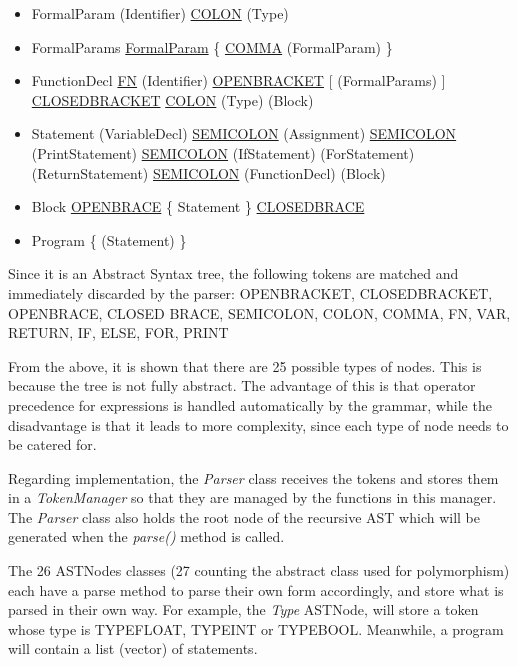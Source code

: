 \begin{itemize}
	\item FormalParam
		\subitem (Identifier) \ul{COLON} (Type)
	\item FormalParams
		\subitem \ul{FormalParam} \{ \ul{COMMA} (FormalParam) \}
	\item FunctionDecl
		\subitem \ul{FN} (Identifier) \ul{OPEN\un BRACKET} [ (FormalParams) ] \ul{CLOSED\un BRACKET} \ul{COLON} (Type) (Block)
	\item Statement
		\subitem (VariableDecl) \ul{SEMI\un COLON}
		\subitem (Assignment) \ul{SEMI\un COLON}
		\subitem (PrintStatement) \ul{SEMI\un COLON}
		\subitem (IfStatement)
		\subitem (ForStatement)
		\subitem (ReturnStatement) \ul{SEMI\un COLON}
		\subitem (FunctionDecl)
		\subitem (Block)
	\item Block
		\subitem \ul{OPEN\un BRACE} \{ Statement \} \ul{CLOSED\un BRACE}
	\item Program
		\subitem \{ (Statement) \}
\end{itemize}

Since it is an Abstract Syntax tree, the following tokens are matched and immediately discarded by the parser: OPEN\un BRACKET, CLOSED\un BRACKET, OPEN\un BRACE, CLOSED \un BRACE, SEMI\un COLON, COLON, COMMA, FN, VAR, RETURN, IF, ELSE, FOR, PRINT

From the above, it is shown that there are 25 possible types of nodes. This is because the tree is not fully abstract. The advantage of this is that operator precedence for expressions is handled automatically by the grammar, while the disadvantage is that it leads to more complexity, since each type of node needs to be catered for.

Regarding implementation, the \textit{Parser} class receives the tokens and stores them in a \textit{TokenManager} so that they are managed by the functions in this manager. The \textit{Parser} class also holds the root node of the recursive AST which will be generated when the \textit{parse()} method is called.

The 26 ASTNodes classes (27 counting the abstract class used for polymorphism) each have a parse method to parse their own form accordingly, and store what is parsed in their own way. For example, the \textit{Type} ASTNode, will store a token whose type is TYPE\un FLOAT, TYPE\un INT or TYPE\un BOOL. Meanwhile, a program will contain a list (vector) of statements.

